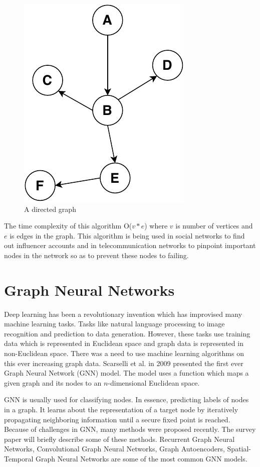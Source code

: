 \documentclass[journal,twoside,web]{ieeecolor}
\begin{document}
\begin{figure}[!h]
    \centerline{\includegraphics[scale=0.8]{figures/betweeness.pdf}}
    \caption{A directed graph}
    \label{fig15}
\end{figure}

The time complexity of this algorithm O($v*e$) where $v$ is number of vertices and $e$ is edges in the graph. This algorithm is being used in social networks to find out influencer accounts and in telecommunication networks to pinpoint important nodes in the network so as to prevent these nodes to failing.

\section{Graph Neural Networks}
\label{sec:gnn}
Deep learning has been a revolutionary invention which has improvised many machine learning tasks. Tasks like natural language processing to image recognition and prediction to data generation. However, these tasks use training data which is represented in Euclidean space and graph data is represented in non-Euclidean space. There was a need to use machine learning algorithms on this ever increasing graph data. Scarselli et al. in 2009 presented the first ever Graph Neural Network (GNN) model\cite{34}. The model uses a function which maps a given graph and its nodes to an $n$-dimensional Euclidean space. 

GNN is usually used for classifying nodes. In essence, predicting labels of nodes in a graph. It learns about the representation of a target node by iteratively propagating neighboring information until a secure fixed point is reached. Because of challenges in GNN, many methods were proposed recently. The survey paper will briefly describe some of these methods. Recurrent Graph Neural Networks, Convolutional Graph Neural Networks, Graph Autoencoders, Spatial-Temporal Graph Neural Networks are some of the most common GNN models\cite{33}.
\end{document}
